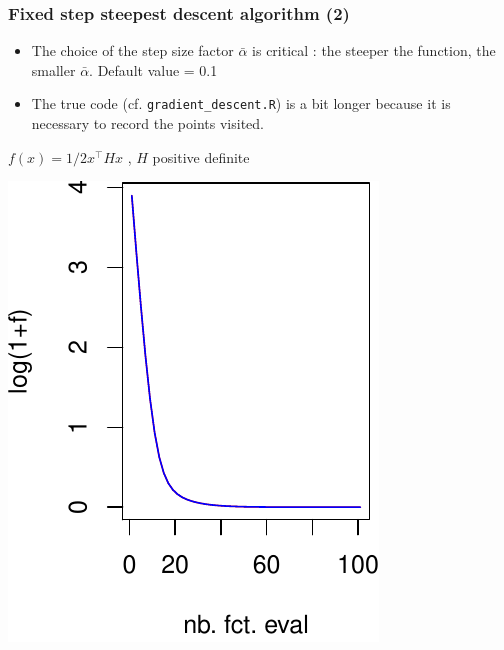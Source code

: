 \documentclass[12pt]{beamer}
\begin{document}
\begin{frame}
\frametitle{Fixed step steepest descent algorithm (2)} 
\begin{itemize}
\item The choice of the step size factor $\bar\alpha$ is critical : the steeper the function, the smaller $\bar\alpha$. Default value = 0.1
\item The true code (cf. \texttt{gradient\_descent.R}) is a bit longer because it is necessary to record the points visited.
\end{itemize}
\vspace{-0.5cm}
\begin{center}
{\scriptsize $f(x) = 1/2 x^\top H x$ , $H$ positive definite}\\
\begin{minipage}[b]{0.3\textwidth}
\includegraphics[width=\textwidth]{gradient_quad_2d_f_alpha01-crop.pdf} 
\end{minipage}
\hspace{1.5cm}
\begin{minipage}[b]{0.3\textwidth}

\end{minipage}
\end{center}
\end{frame}
\end{document}
